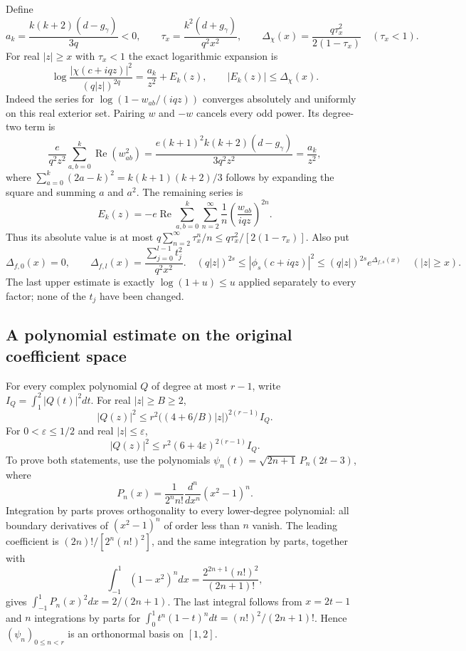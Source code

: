 Define
\begin{equation}
 a_k=\frac{k(k+2)(d-g_\gamma)}{3q}<0,\qquad
 \tau_x=\frac{k^2(d+g_\gamma)}{q^2x^2},\qquad
 \Delta_\chi(x)=\frac{q\tau_x^2}{2(1-\tau_x)}
 \quad(\tau_x<1).
 \tag{FTC6}
\end{equation}
For real $|z|\ge x$ with $\tau_x<1$ the exact logarithmic expansion is
\begin{equation}
 \log\frac{|\chi(c+iqz)|^2}{(q|z|)^{2q}}
 =\frac{a_k}{z^2}+E_k(z),\qquad |E_k(z)|\le\Delta_\chi(x).
 \tag{FTC7}
\end{equation}
Indeed the series for $\log(1-w_{ab}/(iqz))$ converges absolutely and
uniformly on this real exterior set.  Pairing $w$ and $-w$ cancels every
odd power.  Its degree-two term is
\[
 \frac{e}{q^2z^2}\sum_{a,b=0}^k\operatorname{Re}(w_{ab}^2)
 =\frac{e(k+1)^2k(k+2)(d-g_\gamma)}{3q^2z^2}
 =\frac{a_k}{z^2},
\]
where $\sum_{a=0}^k(2a-k)^2=k(k+1)(k+2)/3$ follows by expanding the
square and summing $a$ and $a^2$.  The remaining series is
\[
 E_k(z)=-e\operatorname{Re}
 \sum_{a,b=0}^k\sum_{n=2}^\infty
 \frac1n\left(\frac{w_{ab}}{iqz}\right)^{2n}.
\]
Thus its absolute value is at most
$q\sum_{n=2}^\infty\tau_x^n/n\le q\tau_x^2/[2(1-\tau_x)]$.
Also put
\begin{equation}
 \Delta_{f,0}(x)=0,\qquad
 \Delta_{f,l}(x)=\frac{\sum_{j=0}^{l-1}t_j^2}{q^2x^2}.
 \quad
 (q|z|)^{2s}\le|\phi_s(c+iqz)|^2
 \le(q|z|)^{2s}e^{\Delta_{f,s}(x)}\quad(|z|\ge x).
 \tag{FTC8}
\end{equation}
The last upper estimate is exactly $\log(1+u)\le u$ applied separately
to every factor; none of the $t_j$ have been changed.

\subsection{A polynomial estimate on the original coefficient space}

For every complex polynomial $Q$ of degree at most $r-1$, write
$I_Q=\int_1^2|Q(t)|^2dt$.  For real $|z|\ge B\ge2$,
\begin{equation}
 |Q(z)|^2\le r^2\bigl((4+6/B)|z|\bigr)^{2(r-1)}I_Q.
 \tag{FTC9}
\end{equation}
For $0<\varepsilon\le1/2$ and real $|z|\le\varepsilon$,
\begin{equation}
 |Q(z)|^2\le r^2(6+4\varepsilon)^{2(r-1)}I_Q.
 \tag{FTC10}
\end{equation}
To prove both statements, use the polynomials
$\psi_n(t)=\sqrt{2n+1}\,P_n(2t-3)$, where
\[
 P_n(x)=\frac{1}{2^n n!}\frac{d^n}{dx^n}(x^2-1)^n.
\]
Integration by parts proves orthogonality to every lower-degree polynomial:
all boundary derivatives of $(x^2-1)^n$ of order less than $n$ vanish.
The leading coefficient is $(2n)!/[2^n(n!)^2]$, and the same integration
by parts, together with
\[
 \int_{-1}^1(1-x^2)^n dx
 =\frac{2^{2n+1}(n!)^2}{(2n+1)!},
\]
gives $\int_{-1}^1P_n(x)^2dx=2/(2n+1)$.  The last integral follows from
$x=2t-1$ and $n$ integrations by parts for
$\int_0^1t^n(1-t)^n dt=(n!)^2/(2n+1)!$.
Hence $(\psi_n)_{0\le n<r}$ is an orthonormal basis on $[1,2]$.


